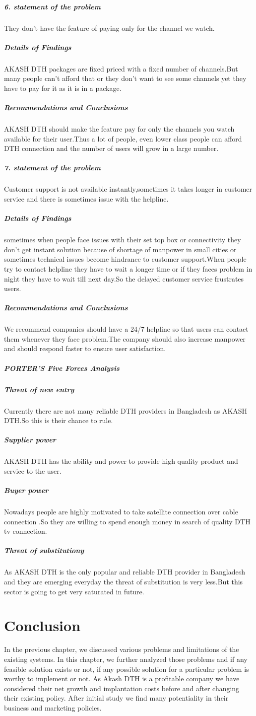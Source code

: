 \begin{spacing}{1.0}
\subparagraph{6. statement of the problem}
They don’t have the feature of paying only for the channel we watch.
\subparagraph{Details of Findings}
 AKASH DTH packages are fixed priced with a fixed number of channels.But many people can’t afford that or they don’t want to see some channels yet they have to pay for it as it is in a package.
\subparagraph{Recommendations and Conclusions}
 AKASH DTH should make the feature pay for only the channels you watch available for their user.Thus a lot of people, even lower class people can afford DTH connection and the number of users will grow in a large number.



\subparagraph{7. statement of the problem}
Customer support is not available instantly,sometimes it takes longer in customer service and there is sometimes issue with the helpline.
\subparagraph{Details of Findings}
sometimes when people face issues with their set top box or connectivity they don’t get instant solution because of shortage of manpower in small cities or sometimes technical issues become hindrance to customer support.When people try to contact helpline they have to wait a longer time or if they faces problem in night they have to wait till next day.So the delayed customer service frustrates users.
\subparagraph{Recommendations and Conclusions}
We recommend companies should have a 24/7 helpline so that users can contact them whenever they face problem.The company should also increase manpower and should respond faster to ensure user satisfaction.
 
\subparagraph{PORTER’S Five Forces Analysis}
\subparagraph{Threat of new entry}
Currently there are not many reliable DTH providers in Bangladesh as AKASH DTH.So this is their chance to rule.

\subparagraph{Supplier power}
AKASH DTH has the ability and power to provide high quality product and service to the user.
\subparagraph{Buyer power}
Nowadays people are highly motivated to take satellite connection over cable connection .So they are willing to spend enough money in search of quality DTH tv connection.
\subparagraph{Threat of substitutiony}
As AKASH DTH is the only popular and reliable DTH provider in Bangladesh and they are emerging everyday the threat of substitution is very less.But this sector is going to get very saturated in future.

\section{Conclusion}
In the previous chapter, we discussed various problems and limitations of the existing systems. In this chapter, we further analyzed those problems and if any feasible solution exists or not, if any possible solution for a particular problem is worthy to implement or not. As Akash DTH is a profitable company we have considered their net growth and implantation costs before and after changing their existing policy. After initial study we find many potentiality in their business and marketing policies.     
\end{spacing}